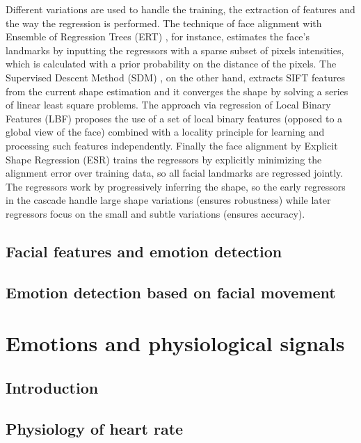 Different variations are used to handle the training, the extraction of features and the way the regression is performed. The technique of face alignment with Ensemble of Regression Trees (ERT) \parencite{kazemi2014one}, for instance, estimates the face's landmarks by inputting the regressors with a sparse subset of pixels intensities, which is calculated with a prior probability on the distance of the pixels. The Supervised Descent Method (SDM) \parencite{xiong2013supervised}, on the other hand, extracts SIFT features from the current shape estimation and it converges the shape by solving a series of linear least square problems. The approach via regression of Local Binary Features (LBF) \parencite{ren2014face} proposes the use of a set of local binary features (opposed to a global view of the face) combined with a locality principle for learning and processing such features independently. Finally the face alignment by Explicit Shape Regression (ESR) \parencite{cao2014face} trains the regressors by explicitly minimizing the alignment error over training data, so all facial landmarks are regressed jointly. The regressors work by progressively inferring the shape, so the early regressors in the cascade handle large shape variations (ensures robustness) while later regressors focus on the small and subtle variations (ensures accuracy).

\subsection{Facial features and emotion detection}

\subsection{Emotion detection based on facial movement}

\section{Emotions and physiological signals}
\subsection{Introduction}
\subsection{Physiology of heart rate}
